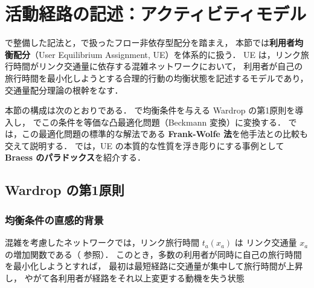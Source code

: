 
\section{活動経路の記述：アクティビティモデル}\label{sec:abms}

で整備した記法と，で扱ったフロー非依存型配分を踏まえ，
本節では\textbf{利用者均衡配分}（User Equilibrium Assignment, UE）を体系的に扱う．
UE は，リンク旅行時間がリンク交通量に依存する混雑ネットワークにおいて，
利用者が自己の旅行時間を最小化しようとする合理的行動の均衡状態を記述するモデルであり，
交通量配分理論の根幹をなす\cite{Wardrop1952,Beckmann1956}．

本節の構成は次のとおりである．
 で均衡条件を与える Wardrop の第1原則を導入し，
 でこの条件を等価な凸最適化問題（Beckmann 変換）に変換する．
 では，この最適化問題の標準的な解法である
\textbf{Frank-Wolfe 法}を他手法との比較も交えて説明する．
 では，UE の本質的な性質を浮き彫りにする事例として
\textbf{Braess のパラドックス}を紹介する．

\subsection{Wardrop の第1原則}
\label{subsec:wardrop}

\subsubsection*{均衡条件の直感的背景}

混雑を考慮したネットワークでは，リンク旅行時間 $t_a(x_a)$ は
リンク交通量 $x_a$ の増加関数である（  参照）．
このとき，多数の利用者が同時に自己の旅行時間を最小化しようとすれば，
最初は最短経路に交通量が集中して旅行時間が上昇し，
やがて各利用者が経路をそれ以上変更する動機を失う状態